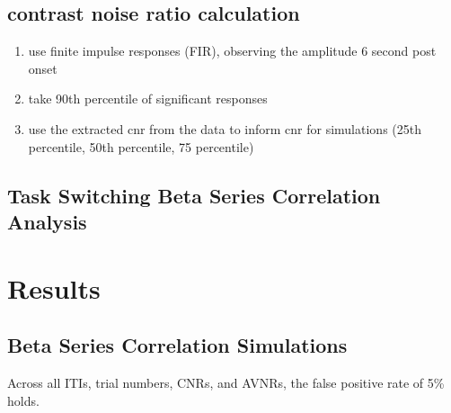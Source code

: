 \documentclass[10pt,letterpaper]{article}
\begin{document}
\subsection*{contrast noise ratio calculation}
\begin{enumerate}
  \item use finite impulse responses (FIR), observing the amplitude 6 second post onset
  \item take 90th percentile of significant responses
  \item use the extracted cnr from the data to inform cnr for simulations (25th percentile, 50th percentile, 75 percentile)
\end{enumerate}

\subsection*{Task Switching Beta Series Correlation Analysis}



\section*{Results}

\subsection*{Beta Series Correlation Simulations}
Across all ITIs, trial numbers, CNRs, and AVNRs, the false positive rate of 5\%
holds.
\end{document}
